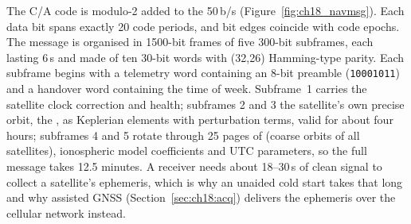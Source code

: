 The C/A code is modulo-2 added to the 50\,b/s 
(Figure~\ref{fig:ch18_navmsg}). Each data bit spans exactly 20 code periods, and bit edges coincide
with code epochs. The message is organised in 1500-bit frames of five 300-bit subframes, each
lasting 6\,s and made of ten 30-bit words with (32,26) Hamming-type parity. Each subframe begins
with a telemetry word containing an 8-bit preamble (\texttt{10001011}) and a handover word
containing the time of week. Subframe~1 carries the satellite clock correction and health;
subframes 2 and 3 the satellite's own precise orbit, the , as Keplerian elements
with perturbation terms, valid for about four hours; subframes 4 and 5 rotate through 25 pages of
 (coarse orbits of all satellites), ionospheric model coefficients and UTC
parameters, so the full message takes 12.5 minutes. A receiver needs about 18--30\,s of clean
signal to collect a satellite's ephemeris, which is why an unaided cold start takes that long and
why assisted GNSS (Section~\ref{sec:ch18:acq}) delivers the ephemeris over the cellular network
instead.

